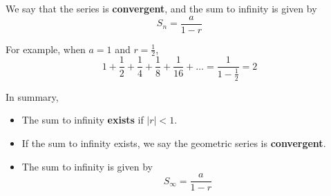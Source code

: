 \documentclass[11pt,a4paper]{book}
\begin{document}
We say that the series is \textbf{convergent}, and the sum to infinity
is given by
\[
S_{n}=\frac{a}{1-r}
\]

For example, when $a=1$ and ${\displaystyle r=\frac{1}{2}}$,
\[
{\displaystyle 1+\frac{1}{2}+\frac{1}{4}+\frac{1}{8}+\frac{1}{16}+\ldots=\frac{1}{1-\frac{1}{2}}=2}
\]

In summary,

\begin{tcolorbox}[colback=blue!5, colframe=black,boxrule=.4pt, sharpish corners]

\medskip{}

\begin{itemize}

\item The sum to infinity \textbf{exists} if $\left|r\right|<1$.

\medskip{}

\item If the sum to infinity exists, we say the geometric series
is \textbf{convergent}.

\medskip{}

\item The sum to infinity is given by
\[
S_{\infty}=\frac{a}{1-r}
\]
\end{itemize}
\end{tcolorbox}

\newpage
\end{document}
